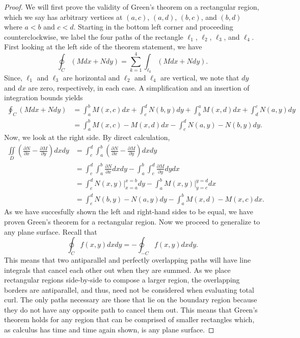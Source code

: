 \begin{proof}
    We will first prove the validity of Green's theorem on a rectangular region, which we say has arbitrary vertices at $(a, c)$, $(a, d)$, $(b, c)$, and $(b, d)$ where $a < b$ and $c < d$. Starting in the bottom left corner and proceeding counterclockwise, we label the four paths of the rectangle $\ell_{1}$, $\ell_{2}$, $\ell_{3}$, and $\ell_{4}$. First looking at the left side of the theorem statement, we have
    \[\oint_{C}(Mdx + Ndy) = \sum_{k = 1}^{4}\int_{\ell_{k}}(Mdx + Ndy).\]
    Since, $\ell_{1}$ and $\ell_{3}$ are horizontal and $\ell_{2}$ and $\ell_{4}$ are vertical, we note that $dy$ and $dx$ are zero, respectively, in each case. A simplification and an insertion of integration bounds yields
    \begin{align*}
        \oint_{C}(Mdx + Ndy) &= \int_{a}^{b}M(x, c)dx + \int_{c}^{d}N(b, y)dy + \int_{b}^{a}M(x, d)dx + \int_{d}^{c}N(a, y)dy \\
        &= \int_{a}^{b}M(x, c) - M(x, d)dx - \int_{c}^{d}N(a, y) - N(b, y)dy.
    \end{align*}
    Now, we look at the right side. By direct calculation,
    \begin{align*}
        \iint\limits_{D}\left(\frac{\partial N}{\partial x} - \frac{\partial M}{\partial y}\right)dxdy &= \int_{c}^{d}\int_{a}^{b}\left(\frac{\partial N}{\partial x} - \frac{\partial M}{\partial y}\right)dxdy \\
        &= \int_{c}^{d}\int_{a}^{b}\frac{\partial N}{\partial x}dxdy - \int_{a}^{b}\int_{c}^{d}\frac{\partial M}{\partial y}dydx \\
        &= \int_{c}^{d} N(x, y) \biggr\rvert_{x = a}^{x = b} dy - \int_{a}^{b} M(x, y) \biggr\rvert_{y = c}^{y = d} dx \\
        &= \int_{c}^{d} N(b, y) - N(a, y) dy - \int_{a}^{b} M(x, d) - M(x, c) dx.
    \end{align*}
    As we have succesfully shown the left and right-hand sides to be equal, we have proven Green's theorem for a rectangular region. Now we proceed to generalize to any plane surface. Recall that
    \[\oint_{C}f(x, y)dxdy = -\oint_{-C}f(x, y)dxdy.\]
    This means that two antiparallel and perfectly overlapping paths will have line integrals that cancel each other out when they are summed. As we place rectangular regions side-by-side to compose a larger region, the overlapping borders are antiparallel, and thus, need not be considered when evaluating total curl. The only paths necessary are those that lie on the boundary region because they do not have any opposite path to cancel them out. This means that Green's theorem holds for any region that can be comprised of smaller rectangles which, as calculus has time and time again shown, is any plane surface.
\end{proof}

